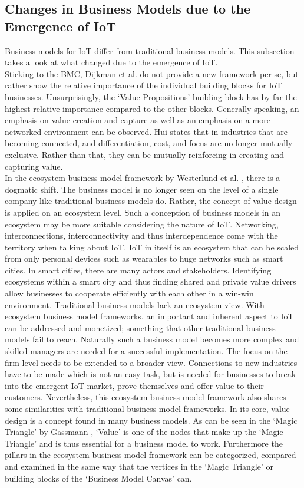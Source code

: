 	\subsection{Changes in Business Models due to the Emergence of IoT}
	\vspace{-1em}
		Business models for IoT differ from traditional business models. This subsection takes a look at what changed due to the emergence of IoT.\\
		Sticking to the BMC, Dijkman et al. \cite{dijkman} do not provide a new framework per se, but rather show the relative importance of the individual building blocks for IoT businesses. Unsurprisingly, the `Value Propositions' building block has by far the highest relative importance compared to the other blocks. Generally speaking, an emphasis on value creation and capture as well as an emphasis on a more networked environment can be observed. Hui \cite{hui} states that in industries that are becoming connected, and differentiation, cost, and focus are no longer mutually exclusive. Rather than that, they can be mutually reinforcing in creating and capturing value.\\
		In the ecosystem business model framework by Westerlund et al. \cite{westerlund}, there is a dogmatic shift. The business model is no longer seen on the level of a single company like traditional business models do. Rather, the concept of value design is applied on an ecosystem level. Such a conception of business models in an ecosystem may be more suitable considering the nature of IoT. Networking, interconnections, interconnectivity and thus interdependence come with the territory when talking about IoT. IoT in itself is an ecosystem that can be scaled from only personal devices such as wearables to huge networks such as smart cities. In smart cities, there are many actors and stakeholders. Identifying ecosystems within a smart city and thus finding shared and private value drivers allow businesses to cooperate efficiently with each other in a win-win environment. Traditional business models lack an ecosystem view. With ecosystem business model frameworks, an important and inherent aspect to IoT can be addressed and monetized; something that other traditional business models fail to reach. Naturally such a business model becomes more complex and skilled managers are needed for a successful implementation. The focus on the firm level needs to be extended to a broader view. Connections to new industries have to be made which is not an easy task, but is needed for businesses to break into the emergent IoT market, prove themselves and offer value to their customers. Nevertheless, this ecosystem business model framework also shares some similarities with traditional business model frameworks. In its core, value design is a concept found in many business models. As can be seen in the `Magic Triangle' by Gassmann \cite{gassmann55}, `Value' is one of the nodes that make up the `Magic Triangle' and is thus essential for a business model to work. Furthermore the pillars in the ecosystem business model framework can be categorized, compared and examined in the same way that the vertices in the `Magic Triangle' or building blocks of the `Business Model Canvas' can.\\
